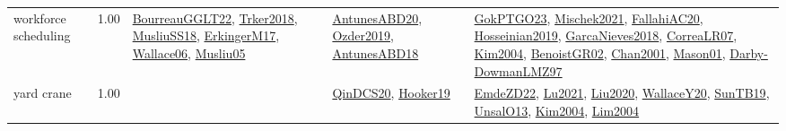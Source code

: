 {\begin{longtable}{p{3cm}r>{\raggedright\arraybackslash}p{6cm}>{\raggedright\arraybackslash}p{6cm}>{\raggedright\arraybackslash}p{8cm}}
\index{workforce scheduling}\index{ApplicationAreas!workforce scheduling}workforce scheduling &  1.00 & \hyperref[detail:BourreauGGLT22]{BourreauGGLT22}, \hyperref[detail:Trker2018]{Trker2018}, \hyperref[detail:MusliuSS18]{MusliuSS18}, \hyperref[detail:ErkingerM17]{ErkingerM17}, \hyperref[detail:Wallace06]{Wallace06}, \hyperref[detail:Musliu05]{Musliu05} & \hyperref[detail:AntunesABD20]{AntunesABD20}, \hyperref[detail:Ozder2019]{Ozder2019}, \hyperref[detail:AntunesABD18]{AntunesABD18} & \hyperref[detail:GokPTGO23]{GokPTGO23}, \hyperref[detail:Mischek2021]{Mischek2021}, \hyperref[detail:FallahiAC20]{FallahiAC20}, \hyperref[detail:Hosseinian2019]{Hosseinian2019}, \hyperref[detail:GarcaNieves2018]{GarcaNieves2018}, \hyperref[detail:CorreaLR07]{CorreaLR07}, \hyperref[detail:Kim2004]{Kim2004}, \hyperref[detail:BenoistGR02]{BenoistGR02}, \hyperref[detail:Chan2001]{Chan2001}, \hyperref[detail:Mason01]{Mason01}, \hyperref[detail:Darby-DowmanLMZ97]{Darby-DowmanLMZ97}\\
\index{yard crane}\index{ApplicationAreas!yard crane}yard crane &  1.00 &  & \hyperref[detail:QinDCS20]{QinDCS20}, \hyperref[detail:Hooker19]{Hooker19} & \hyperref[detail:EmdeZD22]{EmdeZD22}, \hyperref[detail:Lu2021]{Lu2021}, \hyperref[detail:Liu2020]{Liu2020}, \hyperref[detail:WallaceY20]{WallaceY20}, \hyperref[detail:SunTB19]{SunTB19}, \hyperref[detail:UnsalO13]{UnsalO13}, \hyperref[detail:Kim2004]{Kim2004}, \hyperref[detail:Lim2004]{Lim2004}\\
\end{longtable}
}

\clearpage
